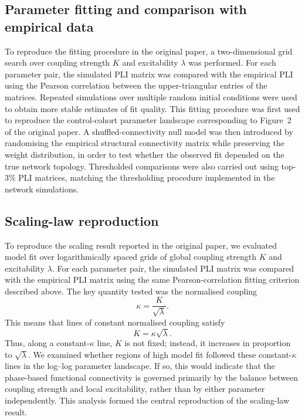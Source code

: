 \documentclass[11pt, reprint, aps, prl, floatfix, secnumarabic]{revtex4-2}
\begin{document}
\subsection{Parameter fitting and comparison with empirical data}
To reproduce the fitting procedure in the original paper, a two-dimensional grid search over coupling strength $K$ and excitability $\lambda$ was performed. For each parameter pair, the simulated PLI matrix was compared with the empirical PLI using the Pearson correlation between the upper-triangular entries of the matrices. Repeated simulations over multiple random initial conditions were used to obtain more stable estimates of fit quality. 
This fitting procedure was first used to reproduce the control-cohort parameter landscape corresponding to Figure~2 of the original paper. A shuffled-connectivity null model was then introduced by randomising the empirical structural connectivity matrix while preserving the weight distribution, in order to test whether the observed fit depended on the true network topology. Thresholded comparisons were also carried out using top-3\% PLI matrices, matching the thresholding procedure implemented in the network simulations.

\subsection{Scaling-law reproduction}
To reproduce the scaling result reported in the original paper, we evaluated model fit over logarithmically spaced grids of global coupling strength \(K\) and excitability \(\lambda\). For each parameter pair, the simulated PLI matrix was compared with the empirical PLI matrix using the same Pearson-correlation fitting criterion described above.
The key quantity tested was the normalised coupling
\begin{equation}
\kappa = \frac{K}{\sqrt{\lambda}} .
\end{equation}
This means that lines of constant normalised coupling satisfy
\begin{equation}
K = \kappa \sqrt{\lambda}.
\end{equation}
Thus, along a constant-\(\kappa\) line, \(K\) is not fixed; instead, it increases in proportion to \(\sqrt{\lambda}\). We examined whether regions of high model fit followed these constant-\(\kappa\) lines in the log--log parameter landscape. If so, this would indicate that the phase-based functional connectivity is governed primarily by the balance between coupling strength and local excitability, rather than by either parameter independently. This analysis formed the central reproduction of the scaling-law result.
\end{document}
